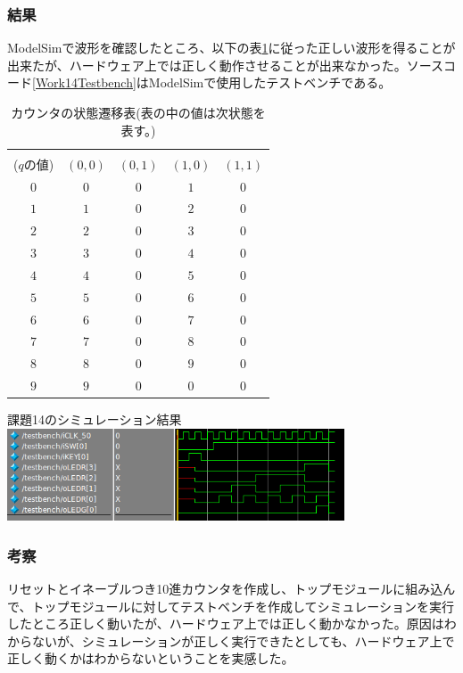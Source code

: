 \documentclass[a4paper]{jarticle}
\begin{document}
\subsubsection{結果}
ModelSimで波形を確認したところ、以下の表\ref{Work14StateTransitionTable}に従った正しい波形を得ることが出来たが、ハードウェア上では正しく動作させることが出来なかった。ソースコード\ref{Work14Testbench}はModelSimで使用したテストベンチである。

\begin{table}[H]
	\begin{center}
		\caption{カウンタの状態遷移表(表の中の値は次状態を表す。)}
		\label{Work14StateTransitionTable}
		\begin{tabular}{|c||c|c|c|c|}
			\hline
			\backslashbox{現状態\\($q$の値)}{$\left(en,clr\right)$}	&$\left(0,0\right)$	&$\left(0,1\right)$	&$\left(1,0\right)$	&$\left(1,1\right)$\\	\hline
			$0$							&$0$			&$0$			&$1$			&$0$\\			\hline
			$1$							&$1$			&$0$			&$2$			&$0$\\			\hline
			$2$							&$2$			&$0$			&$3$			&$0$\\			\hline
			$3$							&$3$			&$0$			&$4$			&$0$\\			\hline
			$4$							&$4$			&$0$			&$5$			&$0$\\			\hline
			$5$							&$5$			&$0$			&$6$			&$0$\\			\hline
			$6$							&$6$			&$0$			&$7$			&$0$\\			\hline
			$7$							&$7$			&$0$			&$8$			&$0$\\			\hline
			$8$							&$8$			&$0$			&$9$			&$0$\\			\hline
			$9$							&$9$			&$0$			&$0$			&$0$\\			\hline
		\end{tabular}
	\end{center}
\end{table}
課題14のシミュレーション結果\\
\includegraphics[width=10cm]{work14/Simulation.png}
\subsubsection{考察}
リセットとイネーブルつき10進カウンタを作成し、トップモジュールに組み込んで、トップモジュールに対してテストベンチを作成してシミュレーションを実行したところ正しく動いたが、ハードウェア上では正しく動かなかった。原因はわからないが、シミュレーションが正しく実行できたとしても、ハードウェア上で正しく動くかはわからないということを実感した。
\end{document}
